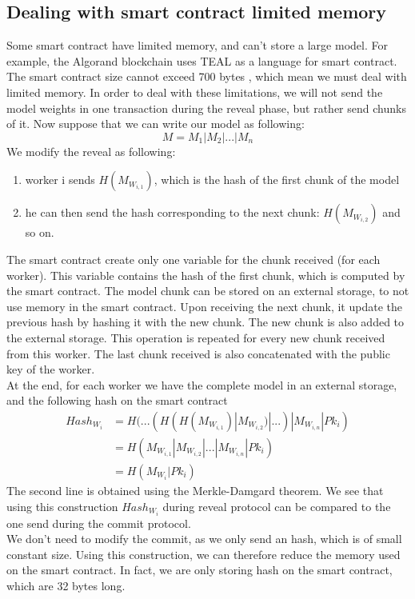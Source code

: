 \documentclass{article}
\begin{document}
\subsection{Dealing with smart contract limited memory}
Some smart contract have limited memory, and can't store a large model. For example, the Algorand blockchain uses TEAL
as a language for smart contract. The smart contract size cannot exceed 700 bytes \cite{TEAL_size}, which mean we must deal with limited
memory.
In order to deal with these limitations, we will not send the model weights in one transaction during the reveal phase,
but rather send chunks of it. Now suppose that we can write our model as following:
\begin{equation}
    M = M_1 | M_2 | ... | M_n
\end{equation}
We modify the reveal as following:
\begin{enumerate}
    \item worker i sends $H(M_{W_{i, 1}})$, which is the hash of the first chunk of the model
    \item he can then send the hash corresponding to the next chunk: $H(M_{W_{i, 2}})$ and so on.
\end{enumerate}
The smart contract create only one variable for the chunk received (for each worker). This variable contains the hash
of the first chunk, which is computed by the smart contract. The model chunk can be stored on an external storage, to
not use memory in the smart contract. Upon receiving the next chunk,
it update the previous hash by hashing it with the new chunk. The new chunk is also added to the external storage. This
operation is repeated for every new chunk received from this worker. The last chunk received is also concatenated with
the public key of the worker.\\
At the end, for each worker we have the complete model in an external storage, and the following hash on the smart contract
\begin{equation}
    \begin{split}
         Hash_{W_i} & = H(...(H(H(M_{W_{i, 1}})|M_{W_{i, 2}})|...)|M_{W_{i, n}}|Pk_i) \\
         & = H(M_{W_{i, 1}} | M_{W_{i, 2}} | ... | M_{W_{i, n}} | Pk_i) \\
         & = H (M_{W_i} | Pk_i)
        \end{split}
\end{equation}
The second line is obtained using the Merkle-Damgard theorem. We see that using this construction
$Hash_{W_i}$ during reveal protocol can be compared to the one send during the commit protocol. \\
We don't need to modify the commit, as we only send an hash, which is of small constant size. Using this construction,
we can therefore reduce the memory used on the smart contract. In fact, we are only storing hash on the smart contract,
which are 32 bytes long.
\end{document}
